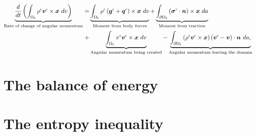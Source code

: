 \begin{equation}
\begin{split}
\underbrace{\frac{d}{dt}\left(\int_{\Omega_{t}} \rho^{\iota}
  \mbox{\boldmath$ v$}^{\iota} \times \mbox{\boldmath$ x$}\ dv\right)}_{\text{Rate of change of angular  momentum}}  = 
& \underbrace{\int_{\Omega_{t}} \rho^{\iota} \left(\mbox{\boldmath$ g$}^{\iota} +
  \mbox{\boldmath$ q$}^{\iota}\right) \times \mbox{\boldmath$ x$}\ dv}_{\text{Moment from body forces}} 
+ \underbrace{\int_{\partial \Omega_{t}}
  \left(\mbox{\boldmath$\sigma$}^{\iota}\cdot\mbox{\boldmath$ n$}\right) \times \mbox{\boldmath$ x$}\ da}_{\text{Moment from traction}}\\ 
+ & \underbrace{\int_{\Omega_{t}} \pi^{\iota}\mbox{\boldmath$ v$}^{\iota} \times
  \mbox{\boldmath$ x$}\ dv}_{\text{Angular momentum being created}} 
- \underbrace{\int_{\partial \Omega_{t}} \left(\rho^{\iota}
  \mbox{\boldmath$ v$}^{\iota}  \times \mbox{\boldmath$ x$}\right) \left(\mbox{\boldmath$ v$}^{\iota} -
\mbox{\boldmath$ v$}\right) \cdot \mbox{\boldmath$ n$}\ da,}_{\text{Angular momentum leaving the domain}} 
\end{split}
\label{globalbalanceofangularmomentum}
\end{equation}

\section{The balance of energy}

\section{The entropy inequality}
